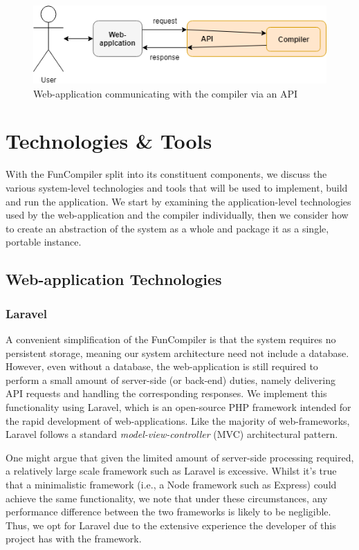 \documentclass{l4proj}
\begin{document}
 \begin{figure}[h]
\centering
\includegraphics[scale=0.5]{images/funinfra0.png}
\caption{Web-application communicating with the compiler via an API}
\label{fig:funinfra0}	
\end{figure}

\section{Technologies \& Tools}
With the FunCompiler split into its constituent components, we discuss the various system-level technologies and tools that will be used to implement, build and run the application. We start by examining the application-level technologies used by the web-application and the compiler individually, then we consider how to create an abstraction of the system as a whole and package it as a single, portable instance.

\subsection{Web-application Technologies}
\subsubsection{Laravel}
A convenient simplification of the FunCompiler is that the system requires no persistent storage, meaning our system architecture need not include a database. However, even without a database, the web-application is still required to perform a small amount of server-side (or back-end) duties, namely delivering API requests and handling the corresponding responses. We implement this functionality using Laravel, which is an open-source PHP framework intended for the rapid development of web-applications. Like the majority of web-frameworks, Laravel follows a standard \textit{model-view-controller} (MVC) architectural pattern. 

One might argue that given the limited amount of server-side processing required, a relatively large scale framework such as Laravel is excessive. Whilst it's true that a minimalistic framework (i.e., a Node framework such as Express) could achieve the same functionality, we note that under these circumstances, any performance difference between the two frameworks is likely to be negligible. Thus, we opt for Laravel due to the extensive experience the developer of this project has with the framework.
\end{document}
